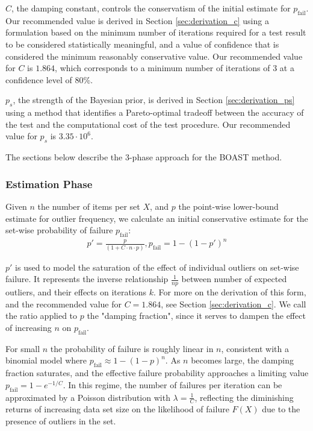 $C$, the damping constant, controls the conservatism of the initial estimate for $p_{\text{fail}}$. Our recommended value is derived in Section \ref{sec:derivation_c} using a formulation based on the minimum number of iterations required for a test result to be considered statistically meaningful, and a value of confidence that is considered the minimum reasonably conservative value. Our recommended value for $C$ is $1.864$, which corresponds to a minimum number of iterations of 3 at a confidence level of 80\%.

$p_s$, the strength of the Bayesian prior, is derived in Section \ref{sec:derivation_ps} using a method that identifies a Pareto-optimal tradeoff between the accuracy of the test and the computational cost of the test procedure. Our recommended value for $p_s$ is $3.35 \cdot 10^{6}$.

The sections below describe the 3-phase approach for the BOAST method.

\subsubsection{Estimation Phase}
Given $n$ the number of items per set $X$, and $p$ the point-wise lower-bound estimate for outlier frequency, we calculate an initial conservative estimate for the set-wise probability of failure $p_\text{fail}$:
\begin{align}
    p' = \frac{p}{(1 + C \cdot n \cdot p)}, 
    p_{\text{fail}} = 1 - (1 - p')^n
\end{align}

$p'$ is used to model the saturation of the effect of individual outliers on set-wise failure. It represents the inverse relationship $\frac{1}{np}$ between number of expected outliers, and their effects on iterations $k$. For more on the derivation of this form, and the recommended value for $C = 1.864 $, see Section \ref{sec:derivation_c}. We call the ratio applied to $p$ the "damping fraction", since it serves to dampen the effect of increasing $n$ on $p_{\text{fail}}$.

For small $n$ the probability of failure is roughly linear in $n$, consistent with a binomial model where $p_{\text{fail}} \approx 1 - (1 - p)^n$. As $n$ becomes large, the damping fraction saturates, and the effective failure probability approaches a limiting value $p_{\text{fail}} = 1 - e^{-1/C}$. In this regime, the number of failures per iteration can be approximated by a Poisson distribution with $\lambda = \frac{1}{C}$, reflecting the diminishing returns of increasing data set size on the likelihood of failure $F(X)$ due to the presence of outliers in the set.

